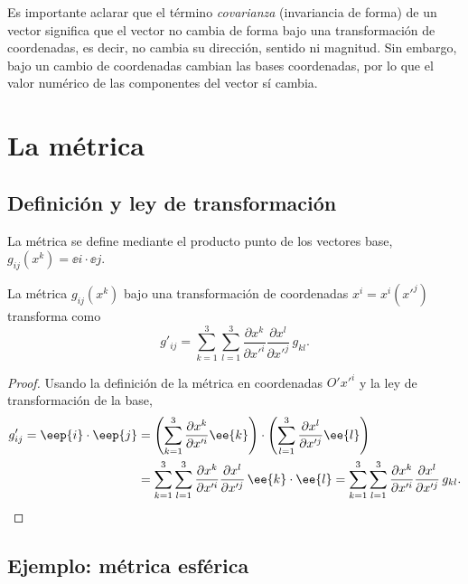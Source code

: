 \begin{observacion}
Es importante aclarar que el término \emph{covarianza} (invariancia de forma) de un vector significa que el vector no cambia de forma bajo una transformación de coordenadas, es decir, no cambia su dirección, sentido ni magnitud. Sin embargo, bajo un cambio de coordenadas cambian las bases coordenadas, por lo que el valor numérico de las componentes del vector sí cambia.
\end{observacion}

\section{La métrica}

\subsection{Definición y ley de transformación}

La métrica se define mediante el producto punto de los vectores base, $g_{ij}(x^k) = \ee{i}\cdot\ee{j}$.

\begin{proposicion}
La métrica $g_{ij}(x^k)$ bajo una transformación de coordenadas $x^i=x^i(x'^j)$ transforma como
\begin{equation}
g'_{ij} = \sum_{k=1}^3\sum_{l=1}^3 \frac{\partial x^k}{\partial x'^i}\frac{\partial x^l}{\partial x'^j}\, g_{kl} .
\end{equation}
\end{proposicion}

\begin{proof}
Usando la definición de la métrica en coordenadas $O'x'^i$ y la ley de transformación de la base,
\begin{align}
g'_{ij} = \eep{i}\cdot\eep{j}
&= \left(\sum_{k=1}^3\frac{\partial x^k}{\partial x'^i}\ee{k}\right)\cdot\left(\sum_{l=1}^3\frac{\partial x^l}{\partial x'^j}\ee{l}\right) \notag\\
&= \sum_{k=1}^3\sum_{l=1}^3 \frac{\partial x^k}{\partial x'^i}\frac{\partial x^l}{\partial x'^j}\,\ee{k}\cdot\ee{l}
= \sum_{k=1}^3\sum_{l=1}^3 \frac{\partial x^k}{\partial x'^i}\frac{\partial x^l}{\partial x'^j}\, g_{kl} .
\end{align}
\end{proof}

\subsection{Ejemplo: métrica esférica}

